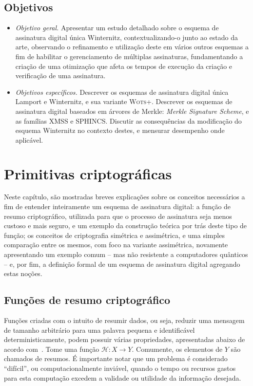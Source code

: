 \documentclass[12pt]{report}
\begin{document}
\section{Objetivos}

\begin{itemize}

\item \emph{Objetivo geral.} Apresentar um estudo detalhado sobre o esquema de
    assinatura digital única Winternitz, contextualizando-o junto ao estado da
    arte, observando o refinamento e utilização deste em vários outros esquemas
    a fim de habilitar o gerenciamento de múltiplas assinaturas, fundamentando
    a criação de uma otimização que afeta os tempos de execução da criação e
    verificação de uma assinatura.
    
\item \emph{Objetivos específicos.} Descrever os esquemas de assinatura digital
    única Lamport e Winternitz, e sua variante \textsc{Wots+}. Descrever
    os esquemas de assinatura digital baseados em árvores de Merkle: \emph{Merkle
    Signature Scheme}, e as famílias XMSS e SPHINCS. Discutir as consequências
    da modificação do esquema Winternitz no contexto destes, e mensurar desempenho
    onde aplicável.

\end{itemize}

\chapter{Primitivas criptográficas}

Neste capítulo, são mostradas breves explicações sobre os conceitos
necessários a fim de entender inteiramente um esquema de assinatura digital:
a função de resumo criptográfico, utilizada para que o processo de assinatura
seja menos custoso e mais seguro, e um exemplo da construção teórica por trás
deste tipo de função; os conceitos de criptografia simétrica e assimétrica, e
uma simples comparação entre os mesmos, com foco na variante assimétrica,
novamente apresentando um exemplo comum -- mas não resistente a computadores
quânticos -- e, por fim, a definição formal de um esquema de assinatura digital
agregando estas noções.

\section{Funções de resumo criptográfico}

Funções criadas com o intuito de resumir dados, ou seja, reduzir uma mensagem
de tamanho arbitrário para uma palavra pequena e identificável
deterministicamente, podem possuir várias propriedades,
apresentadas abaixo de acordo com~\cite[9.2]{Menezes:1996:HAC:548089}.
Tome uma função $\mathcal{H} : X \longrightarrow Y$. Comumente, os elementos de $Y$
são chamados de resumos. É importante notar que um problema é considerado
``difícil'', ou computacionalmente inviável, quando o tempo ou recursos gastos
para esta computação excedem a validade ou utilidade da informação desejada.
\end{document}
